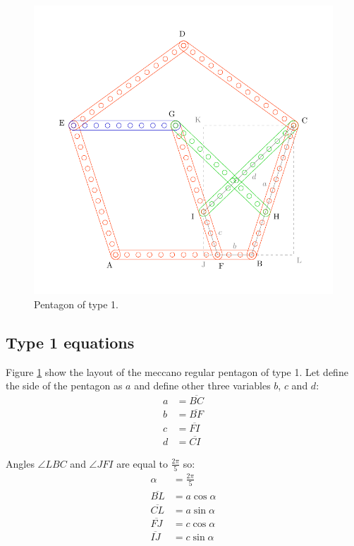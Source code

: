 \documentclass[11pt]{article}
\begin{document}
\begin{figure}[htpb]
\centering
\includegraphics[scale=1]{types/1}
\caption{Pentagon of type 1.}
\label{fig:type-1}
\end{figure}

\subsection{Type 1 equations}

Figure \ref{fig:type-1} show the layout of the meccano regular pentagon of type 1.
Let define the side of the pentagon as $a$ and define other three variables $b$, $c$ and $d$:
\begin{align*}
a &= \overline{BC}\\
b &= \overline{BF}\\
c &= \overline{FI}\\
d &= \overline{CI}
\end{align*}

Angles $\angle{LBC}$ and $\angle{JFI}$ are equal to $\frac{2\pi}{5}$ so:
\begin{align*}
\alpha &= \frac{2\pi}{5}\\
\overline{BL} &= a\cos{\alpha}\\
\overline{CL} &= a\sin{\alpha}\\
\overline{FJ} &= c\cos{\alpha}\\
\overline{IJ} &= c\sin{\alpha}
\end{align*}
\end{document}
